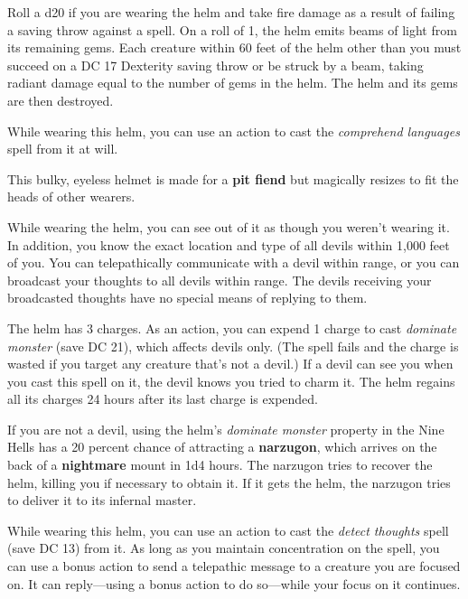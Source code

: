 \documentclass[10pt,a4paper,twoside,bg=print,twocolumn,openany,nodeprecatedcode]{dndbook}
\begin{document}
Roll a d20 if you are wearing the helm and take fire damage as a result of failing a saving throw against a spell. On a roll of 1, the helm emits beams of light from its remaining gems. Each creature within 60 feet of the helm other than you must succeed on a DC 17 Dexterity saving throw or be struck by a beam, taking radiant damage equal to the number of gems in the helm. The helm and its gems are then destroyed.

While wearing this helm, you can use an action to cast the \textit{comprehend languages} spell from it at will.

This bulky, eyeless helmet is made for a \textbf{pit fiend} but magically resizes to fit the heads of other wearers.

While wearing the helm, you can see out of it as though you weren't wearing it. In addition, you know the exact location and type of all devils within 1,000 feet of you. You can telepathically communicate with a devil within range, or you can broadcast your thoughts to all devils within range. The devils receiving your broadcasted thoughts have no special means of replying to them.

The helm has 3 charges. As an action, you can expend 1 charge to cast \textit{dominate monster} (save DC 21), which affects devils only. (The spell fails and the charge is wasted if you target any creature that's not a devil.) If a devil can see you when you cast this spell on it, the devil knows you tried to charm it. The helm regains all its charges 24 hours after its last charge is expended.

If you are not a devil, using the helm's \textit{dominate monster} property in the Nine Hells has a 20 percent chance of attracting a \textbf{narzugon}, which arrives on the back of a \textbf{nightmare} mount in 1d4 hours. The narzugon tries to recover the helm, killing you if necessary to obtain it. If it gets the helm, the narzugon tries to deliver it to its infernal master.

While wearing this helm, you can use an action to cast the \textit{detect thoughts} spell (save DC 13) from it. As long as you maintain concentration on the spell, you can use a bonus action to send a telepathic message to a creature you are focused on. It can reply—using a bonus action to do so—while your focus on it continues.
\end{document}
